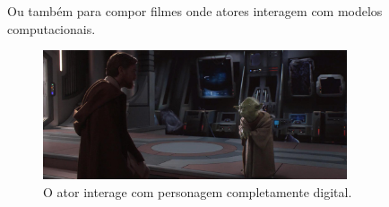 \documentclass[brazil]{beamer}
\begin{document}
\begin{frame}
  Ou também para compor filmes onde atores interagem com modelos computacionais.
      \begin{figure}
        \centering
        \includegraphics[width = 0.8\textwidth, keepaspectratio]{./img/actorAndAnimation.jpg}
        \caption{O ator interage com personagem completamente digital.}
      \end{figure}
\end{frame}
\end{document}
